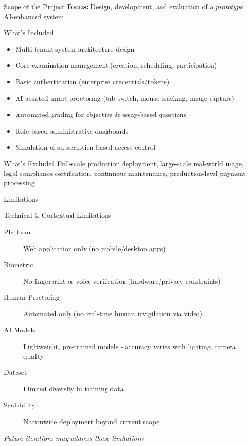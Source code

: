 \begin{frame}{Scope of the Project}
    \textbf{Focus:} Design, development, and evaluation of a \textit{prototype} AI-enhanced system
    
    \begin{block}{What's Included}
        \begin{itemize}
            \item Multi-tenant system architecture design
            \item Core examination management (creation, scheduling, participation)
            \item Basic authentication (enterprise credentials/tokens)
            \item AI-assisted smart proctoring (tab-switch, mouse tracking, image capture)
            \item Automated grading for objective \& essay-based questions
            \item Role-based administrative dashboards
            \item Simulation of subscription-based access control
        \end{itemize}
    \end{block}
    
    \begin{alertblock}{What's Excluded}
        Full-scale production deployment, large-scale real-world usage, legal compliance certification, continuous maintenance, production-level payment processing
    \end{alertblock}
\end{frame}

\begin{frame}{Limitations}
    \begin{block}{Technical \& Contextual Limitations}
        \begin{description}
            \item[Platform] Web application only (no mobile/desktop apps)
            \item[Biometric] No fingerprint or voice verification (hardware/privacy constraints)
            \item[Human Proctoring] Automated only (no real-time human invigilation via video)
            \item[AI Models] Lightweight, pre-trained models - accuracy varies with lighting, camera quality
            \item[Dataset] Limited diversity in training data
            \item[Scalability] Nationwide deployment beyond current scope
        \end{description}
    \end{block}
    
    \vspace{0.3cm}
    \textit{Future iterations may address these limitations}
\end{frame}

